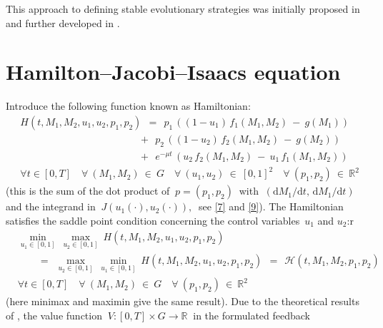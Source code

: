 \documentclass[11pt]{amsart}
\begin{document}
This approach to defining stable evolutionary strategies was initially proposed
in \cite{BernhardGrognardMailleretAkhmetzhanov2010} and further developed
in \cite{YegorovGrognardMailleretHalkettBernhard2019}.


\section{Hamilton--Jacobi--Isaacs equation}

Introduce the following function known as Hamiltonian:
\begin{equation}
\begin{aligned}
& H(t, M_1, M_2, u_1, u_2, p_1, p_2) \:\: = \:\:
p_1 \, ((1 - u_1) \, f_1(M_1, M_2) \: - \: g(M_1)) \\
& \qquad\qquad\qquad\qquad\qquad\quad \:\:\:\,
+ \:\: p_2 \, ((1 - u_2) \, f_2(M_1, M_2) \: - \: g(M_2)) \\
& \qquad\qquad\qquad\qquad\qquad\quad \:\:\:\,
+ \:\: e^{-\mu t} \, (u_2 \, f_2(M_1, M_2) \: - \: u_1 \, f_1(M_1, M_2)) \\
& \forall t \in [0, T] \quad \forall \: (M_1, M_2) \: \in \: G \quad \forall
  \: (u_1, u_2) \: \in \: [0, 1]^2 \quad
\forall \: (p_1, p_2) \: \in \: \mathbb{R}^2
\end{aligned}  \label{12}
\end{equation}
(this is the sum of the dot product of $ \: p = (p_1, p_2) \: $ with
$ \: (\mathrm{d} M_1 / \mathrm{d} t, \, \mathrm{d} M_1 / \mathrm{d} t) \: $ and
the integrand in $ \: J(u_1(\cdot), u_2(\cdot)), \: $ see \cref{7} and
\cref{9}). The Hamiltonian satisfies the saddle point condition concerning
the control variables~$ u_1 $ and
$ u_2 $:r
\begin{equation}
\begin{aligned}
& \min_{u_1 \in [0, 1]} \: \max_{u_2 \in [0, 1]} \: H(t, M_1, M_2, u_1, u_2,
  p_1, p_2) \\
& \qquad
= \:\: \max_{u_2 \in [0, 1]} \: \min_{u_1 \in [0, 1]} \: H(t, M_1, M_2, u_1,
  u_2, p_1, p_2) \:\:
= \:\: \mathcal{H} (t, M_1, M_2, p_1, p_2) \\
& \forall t \in [0, T] \quad \forall \: (M_1, M_2) \: \in \: G \quad \forall
  \: (p_1, p_2) \: \in \: \mathbb{R}^2
\end{aligned}  \label{13}
\end{equation}
(here minimax and maximin give the same result). Due to the theoretical
results of \cite[\S XI.6]{FlemingSoner2006}, the value function 
$ \: V \colon [0, T] \times G \to \mathbb{R} \: $ in the formulated feedback
\end{document}
